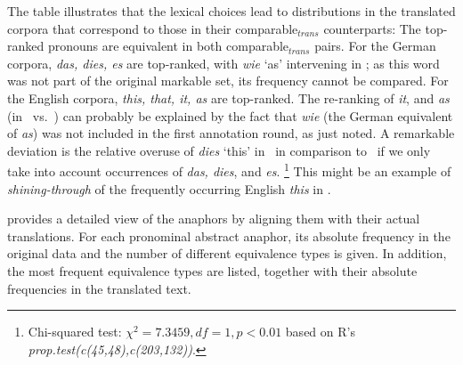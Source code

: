 \documentclass[output=paper]{LSP/langsci}
\begin{document}
The table illustrates that the lexical choices lead to distributions in the translated corpora that correspond to those in their comparable$_{trans}$ counterparts: The top-ranked pronouns are equivalent in both comparable$_{trans}$ pairs. For the German corpora, \textit{das, dies, es} are top-ranked, with \textit{wie} `as' intervening in \DEt; as this word was not part of the original markable set, its frequency cannot  be compared. For the English corpora, \textit{this, that, it, as} are top-ranked. The re-ranking of \textit{it}, and \textit{as} (in \ENt\ vs.\ \ENo) can probably be explained by the fact that \textit{wie} (the German equivalent of \textit{as}) was not included  in the first annotation round, as just noted. A remarkable deviation is the relative overuse of \textit{dies} `this' in \DEt\ in comparison to \DEo\, if we only take into account occurrences of \emph{das, dies}, and \textit{es}.%
\footnote{%
Chi-squared test: $\chi^2=7.3459, df=1, p<0.01$ based on R's \emph{prop.test(c(45,48),c(203,132))}. %
} %
This might be an example of \emph{shining-through} of the  frequently occurring English \textit{this} in \ENo.


 provides a detailed view of the anaphors by aligning them with their actual translations. For each pronominal abstract anaphor, its absolute frequency in the original data and the number of different equivalence types is given. In addition, the most frequent equivalence types are listed, together with their absolute frequencies in the translated text. 
\end{document}
